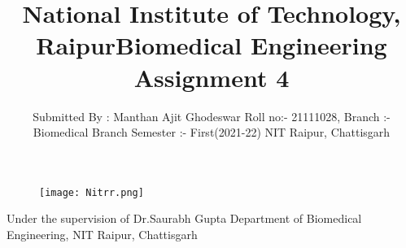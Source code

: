 \documentclass[12pt]{article}
\title{National Institute of Technology, Raipur}
\begin{document}
\maketitle
\begin{figure}[h]
\centering
\texttt{[image: Nitrr.png]}
\end{figure}
\bigskip
\bigskip
\centering
\begin{Large}
\title{Biomedical Engineering Assignment 4}
\end{Large}

\bigskip
\bigskip
\bigskip
\bigskip

\raggedright 
\begin{multicols}{2}
\author{Submitted By : Manthan Ajit Ghodeswar
\linebreak Roll no:- 21111028,
\linebreak Branch :- Biomedical Branch
\linebreak Semester :- First(2021-22)
\linebreak NIT Raipur, Chattisgarh}
\columnbreak
\columnbreak


Under the supervision of
\linebreak Dr.Saurabh Gupta
\linebreak Department of Biomedical Engineering,
\linebreak NIT Raipur, Chattisgarh
\end{multicols}


\clearpage
\end{document}
